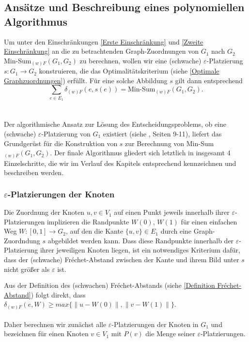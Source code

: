 \documentclass[a4paper, 12pt, twoside]{article}
\theoremstyle{Format1} %
\begin{document}
\subsection{Ansätze und Beschreibung eines polynomiellen Algorithmus} \label{Grundidee des Algorithmus}
Um unter den Einschränkungen \ref{Erste Einschränkung} und \ref{Zweite Einschränkung} an die zu betrachtenden Graph-Zuordnungen von $G_1$ nach $G_2$
Min-Sum$_{(w)F}(G_1,G_2)$ zu berechnen, wollen wir
eine (schwache) $\varepsilon$-Platzierung $s: G_1 \to G_2$ konstruieren, die das Optimalitätskriterium (siehe \ref{Optimale Graphzuordnungen}) erfüllt.
Für eine solche Abbildung $s$ gilt dann entsprechend $$\sum_{e \in E_1}\delta_{(w)F}(e, s(e)) = \text{Min-Sum}_{(w)F}(G_1,G_2).$$
\\
\\
Der algorithmische Ansatz zur Lösung des Entscheidungsproblems, ob eine (schwache) $\varepsilon$-Platzierung von $G_1$ existiert (siehe \cite{Akitaya},
Seiten 9-11), liefert das Grundgerüst für die Konstruktion von $s$ zur Berechnung von Min-Sum$_{(w)F}(G_1,G_2)$.
Der finale Algorithmus gliedert sich letztlich in insgesamt 4 Einzelschritte, die wir im Verlauf des Kapitels entsprechend kennzeichnen und beschreiben werden.

\subsubsection{$\varepsilon$-Platzierungen der Knoten} \label{Platzierungen der Knoten}
Die Zuordnung der Knoten $u,v \in V_1$ auf einen Punkt jeweils innerhalb ihrer $\varepsilon$-Platzierungen implizieren die Randpunkte $W(0)$, $W(1)$
für einen einfachen Weg $W: [0,1] \to G_2$, auf den die Kante $\{u,v\} \in E_1$ durch eine Graph-Zuordndung $s$ abgebildet werden kann.
Dass diese Randpunkte innerhalb der $\varepsilon$-Platzierung ihrer jeweiligen Knoten liegen, ist ein notwendiges Kriterium dafür, dass der (schwache) Fréchet-Abstand
zwischen der Kante und ihrem Bild unter $s$ nicht größer als $\varepsilon$ ist.

Aus der Definition des (schwachen) Fréchet-Abstands (siehe \ref{Definition Fréchet-Abstand}) folgt direkt, dass
$\delta_{(w)F}(e, W) \geq max{\{\|u-W(0)\|, \|v-W(1)\|\}}$.
\\
\\
Daher berechnen wir zunächst alle $\varepsilon$-Platzierungen der Knoten in $G_1$ und bezeichnen für einen Knoten $v \in V_1$ mit $P(v)$ die Menge
seiner $\varepsilon$-Platzierungen.
\end{document}
